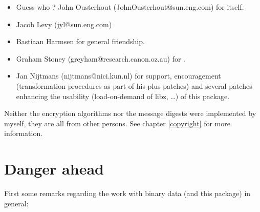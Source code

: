 \begin {itemize}\Large
\item	Guess who ? John Ousterhout (JohnOusterhout@sun.eng.com) for
	\tcl {} itself. 
\item	Jacob Levy (jyl@sun.eng.com)
\item	Bastiaan Harmsen for general friendship.
\item	Graham Stoney (greyham@research.canon.oz.au) for .
\item	Jan Nijtmans (nijtmans@nici.kun.nl) for support, encouragement
	(transformation procedures as part of his plus-patches) and
	several patches enhancing the usability (load-on-demand of
	libz, \dots{}) of this package.
\end   {itemize}

Neither the encryption algorithms nor the message digests were
implemented by myself, they are all from other persons. See chapter
\ref {copyright} for more information.


\chapter {Danger ahead}

First some remarks regarding the work with binary data (and this
package) in general:

